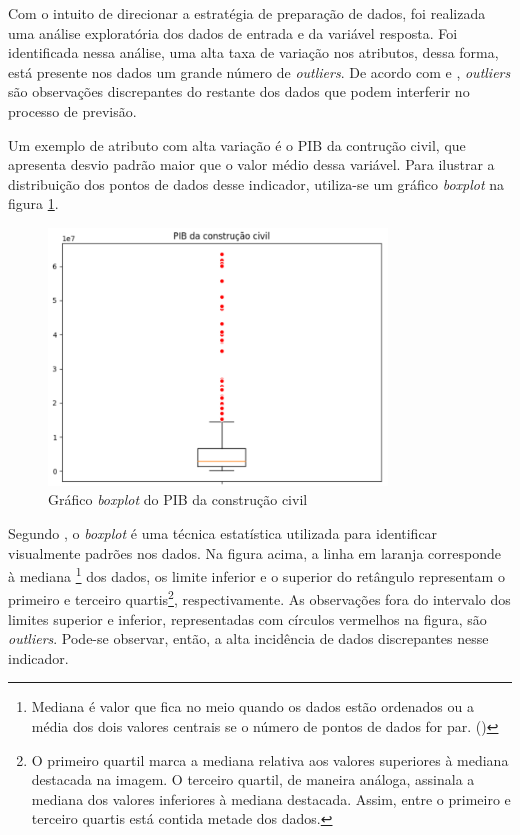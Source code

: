 Com o intuito de direcionar a estratégia de preparação de dados,
foi realizada uma análise exploratória dos dados de 
entrada e da variável resposta. 
Foi identificada nessa análise, uma alta
taxa de variação nos atributos,
dessa forma, está presente nos dados um grande número de \textit{outliers}.
De acordo com \citet{outliers} e \citet{tukey77}, \textit{outliers} são
observações discrepantes do restante dos dados
que podem interferir no processo de previsão. 

Um exemplo de atributo com alta variação é o PIB da contrução civil,
que apresenta desvio padrão maior que o valor médio dessa variável.
Para ilustrar a distribuição dos pontos de dados desse indicador, utiliza-se 
um gráfico \textit{boxplot} na figura \ref{fig:boxplot_pibcc}.

\begin{figure}[H]
    \centering
    \includegraphics[width=9cm]{../figuras/graficos/boxplot-pib-cc.png}
    \caption{Gráfico \textit{boxplot} do PIB da construção civil}
    \label{fig:boxplot_pibcc}
\end{figure}

Segundo \citet{boxplot}, o \textit{boxplot} é
uma técnica estatística utilizada para identificar visualmente padrões nos dados. 
Na figura acima, a linha em laranja corresponde à mediana \footnote{Mediana é
valor que fica no meio quando os dados estão ordenados ou a média
dos dois valores centrais se o número de pontos de dados for par.
(\cite{boxplot-stat})} 
dos dados, os limite inferior e o superior do retângulo representam
o primeiro e terceiro quartis\footnote{O primeiro quartil marca a mediana 
relativa aos valores superiores à mediana destacada na imagem. O terceiro quartil,
de maneira análoga, assinala a mediana dos valores inferiores à mediana destacada. 
Assim, entre o primeiro e terceiro quartis está contida metade
dos dados.}, respectivamente. As observações fora do intervalo dos limites 
superior e inferior, representadas com círculos vermelhos na figura, são 
\textit{outliers}. Pode-se observar, então, a alta incidência de dados discrepantes
nesse indicador.

